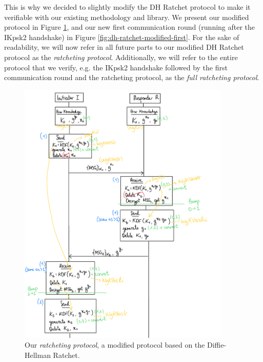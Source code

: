 This is why we decided to slightly modify the DH Ratchet protocol to make it verifiable with our existing methodology and library.
We present our modified protocol in Figure \ref{fig:dh-ratchet-modified}, and our new first communication round (running after the IKpsk2 handshake) in Figure \ref{fig:dh-ratchet-modified-first}.
For the sake of readability, we will now refer in all future parts to our modified DH Ratchet protocol as the \emph{ratcheting protocol}. Additionally, we will refer to the entire protocol that we verify, e.g. the IKpsk2 handshake followed by the first communication round and the ratcheting protocol, as the \emph{full ratcheting protocol}.

\begin{figure}
    \centering
    \includegraphics[width=0.9\textwidth]{figures/DH-ratchet-modified.png}
    \caption{Our \emph{ratcheting protocol}, a modified protocol based on the Diffie-Hellman Ratchet.}
    \label{fig:dh-ratchet-modified}
\end{figure}

